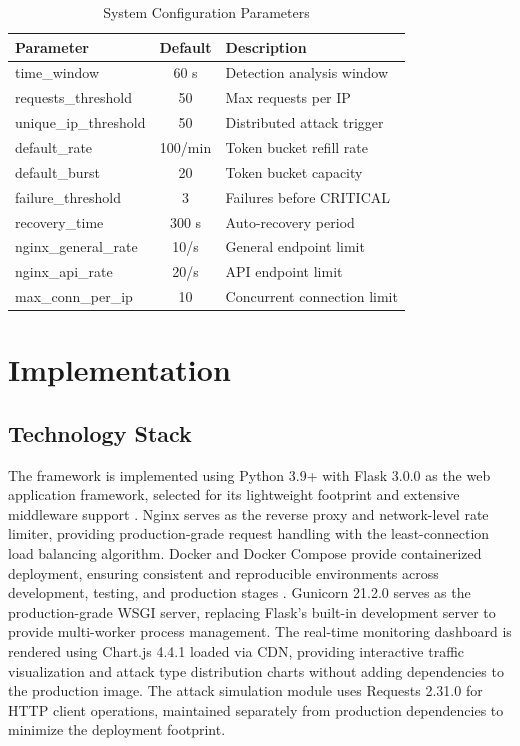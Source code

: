 \documentclass[conference]{IEEEtran}
\begin{document}
\begin{table}[htbp]
\caption{System Configuration Parameters}
\begin{center}
\begin{tabular}{|l|c|l|}
\hline
\textbf{Parameter} & \textbf{Default} & \textbf{Description} \\
\hline
time\_window & 60 s & Detection analysis window \\
\hline
requests\_threshold & 50 & Max requests per IP \\
\hline
unique\_ip\_threshold & 50 & Distributed attack trigger \\
\hline
default\_rate & 100/min & Token bucket refill rate \\
\hline
default\_burst & 20 & Token bucket capacity \\
\hline
failure\_threshold & 3 & Failures before CRITICAL \\
\hline
recovery\_time & 300 s & Auto-recovery period \\
\hline
nginx\_general\_rate & 10/s & General endpoint limit \\
\hline
nginx\_api\_rate & 20/s & API endpoint limit \\
\hline
max\_conn\_per\_ip & 10 & Concurrent connection limit \\
\hline
\end{tabular}
\label{tab_config}
\end{center}
\end{table}

\section{Implementation}

\subsection{Technology Stack}

The framework is implemented using Python 3.9+ with Flask 3.0.0 as the web application framework, selected for its lightweight footprint and extensive middleware support \cite{b24}. Nginx serves as the reverse proxy and network-level rate limiter, providing production-grade request handling with the least-connection load balancing algorithm. Docker and Docker Compose provide containerized deployment, ensuring consistent and reproducible environments across development, testing, and production stages \cite{b23} \cite{b22}. Gunicorn 21.2.0 serves as the production-grade WSGI server, replacing Flask's built-in development server to provide multi-worker process management. The real-time monitoring dashboard is rendered using Chart.js 4.4.1 loaded via CDN, providing interactive traffic visualization and attack type distribution charts without adding dependencies to the production image. The attack simulation module uses Requests 2.31.0 for HTTP client operations, maintained separately from production dependencies to minimize the deployment footprint.
\end{document}
